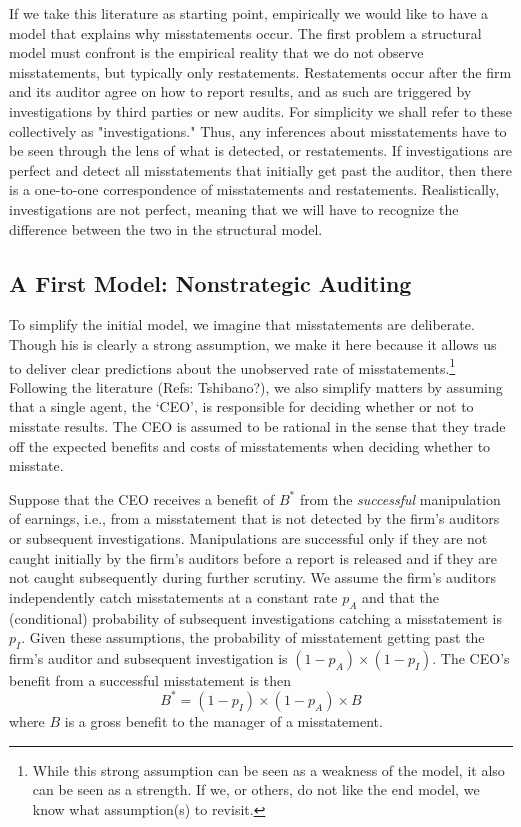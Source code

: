 \documentclass[14pt]{article}
\begin{document}
If we take this literature as starting point, empirically we would like to have a model
that explains why misstatements occur. The first problem a structural model must
confront is the empirical reality that we do not observe misstatements, but typically
only restatements. Restatements occur after the firm and its auditor agree on how
to report results, and as such are triggered by investigations by third parties or new 
audits. For simplicity we shall refer to these collectively as "investigations." Thus,
any inferences about misstatements have to be seen through the lens of what is
detected, or restatements. If investigations are perfect and detect all misstatements
that initially get past the auditor, then there is a one-to-one correspondence of
misstatements and restatements. Realistically, investigations are not perfect,
meaning that we will have to recognize the difference between the two in the
structural model.

\subsection{A First Model: Nonstrategic Auditing}

To simplify the initial model, we imagine that misstatements  are
deliberate. Though his is clearly a strong assumption, we make it here because it 
allows us to deliver clear predictions about the unobserved rate of misstatements.\footnote{
While this strong assumption can be seen as a weakness of the model, it also can be
seen as a strength. If we, or others, do not like the end model, we know what assumption(s)
to revisit.} Following the literature (Refs: Tshibano?), we also simplify matters by assuming that a 
single agent, the `CEO', is responsible for deciding whether or not to misstate results.
The CEO is assumed to be rational in the sense that they trade off the expected benefits 
and costs of misstatements when deciding whether to misstate.

Suppose that the CEO receives a benefit of $B^*$ from the \emph{successful} manipulation of earnings, 
i.e., from a misstatement that is not detected by the firm's auditors or subsequent investigations. 
Manipulations are successful only if they are not caught initially by the firm's auditors before a
report is released and if they are not caught subsequently during further scrutiny. We assume
the firm's auditors independently catch misstatements at a constant rate $p_A$ 
and that the (conditional) probability of subsequent investigations catching a misstatement 
is $p_I$. Given these assumptions, the probability of misstatement getting past the firm's 
auditor and subsequent investigation is $(1-p_A) \times (1 - p_I)$.
The CEO's benefit from a successful misstatement is then
$$ B^* = (1-p_I) \times (1-p_A) \times B$$
where $B$ is a gross benefit to the manager of a misstatement. 
\end{document}
